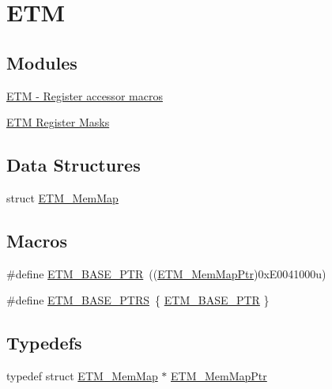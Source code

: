 \hypertarget{group___e_t_m___peripheral}{}\section{E\+T\+M}
\label{group___e_t_m___peripheral}
\subsection*{Modules}
\begin{DoxyCompactItemize}
\item 
\hyperlink{group___e_t_m___register___accessor___macros}{E\+T\+M -\/ Register accessor macros}
\item 
\hyperlink{group___e_t_m___register___masks}{E\+T\+M Register Masks}
\end{DoxyCompactItemize}
\subsection*{Data Structures}
\begin{DoxyCompactItemize}
\item 
struct \hyperlink{struct_e_t_m___mem_map}{E\+T\+M\+\_\+\+Mem\+Map}
\end{DoxyCompactItemize}
\subsection*{Macros}
\begin{DoxyCompactItemize}
\item 
\#define \hyperlink{group___e_t_m___peripheral_ga5f573e73b1defe379e4a2e666d2e47c7}{E\+T\+M\+\_\+\+B\+A\+S\+E\+\_\+\+P\+T\+R}~((\hyperlink{group___e_t_m___peripheral_ga88a18470aafe4a4922485f18a93c172d}{E\+T\+M\+\_\+\+Mem\+Map\+Ptr})0x\+E0041000u)
\item 
\#define \hyperlink{group___e_t_m___peripheral_gaff322b8dea24909f2b9156b5ddcda707}{E\+T\+M\+\_\+\+B\+A\+S\+E\+\_\+\+P\+T\+R\+S}~\{ \hyperlink{group___e_t_m___peripheral_ga5f573e73b1defe379e4a2e666d2e47c7}{E\+T\+M\+\_\+\+B\+A\+S\+E\+\_\+\+P\+T\+R} \}
\end{DoxyCompactItemize}
\subsection*{Typedefs}
\begin{DoxyCompactItemize}
\item 
typedef struct \hyperlink{struct_e_t_m___mem_map}{E\+T\+M\+\_\+\+Mem\+Map} $\ast$ \hyperlink{group___e_t_m___peripheral_ga88a18470aafe4a4922485f18a93c172d}{E\+T\+M\+\_\+\+Mem\+Map\+Ptr}
\end{DoxyCompactItemize}


